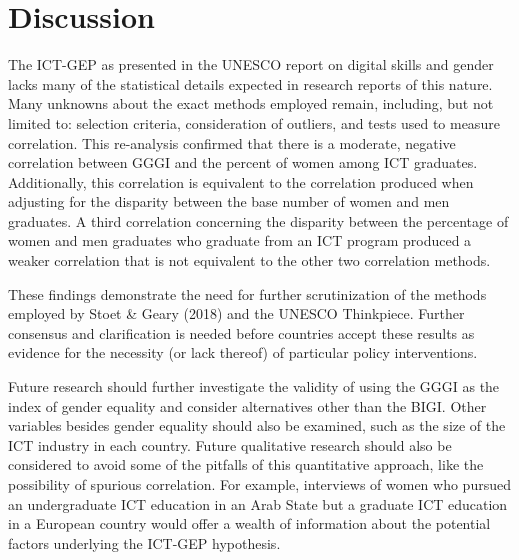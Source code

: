 \documentclass[]{book}
\begin{document}
\chapter{Discussion}\label{discussion}

The ICT-GEP as presented in the UNESCO report on digital skills and
gender lacks many of the statistical details expected in research
reports of this nature. Many unknowns about the exact methods employed
remain, including, but not limited to: selection criteria, consideration
of outliers, and tests used to measure correlation. This re-analysis
confirmed that there is a moderate, negative correlation between GGGI
and the percent of women among ICT graduates. Additionally, this
correlation is equivalent to the correlation produced when adjusting for
the disparity between the base number of women and men graduates. A
third correlation concerning the disparity between the percentage of
women and men graduates who graduate from an ICT program produced a
weaker correlation that is not equivalent to the other two correlation
methods.

These findings demonstrate the need for further scrutinization of the
methods employed by Stoet \& Geary (2018) and the UNESCO Thinkpiece.
Further consensus and clarification is needed before countries accept
these results as evidence for the necessity (or lack thereof) of
particular policy interventions.

Future research should further investigate the validity of using the
GGGI as the index of gender equality and consider alternatives other
than the BIGI. Other variables besides gender equality should also be
examined, such as the size of the ICT industry in each country. Future
qualitative research should also be considered to avoid some of the
pitfalls of this quantitative approach, like the possibility of spurious
correlation. For example, interviews of women who pursued an
undergraduate ICT education in an Arab State but a graduate ICT
education in a European country would offer a wealth of information
about the potential factors underlying the ICT-GEP hypothesis.


\end{document}
